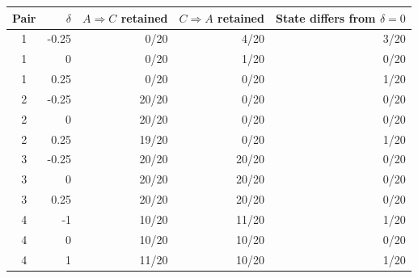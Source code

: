 \begin{table}
\label{tab:split-retention}
\begin{tabular}{crrrr}
\toprule
Pair & $\delta$ & $A\Rightarrow C$ retained & $C\Rightarrow A$ retained & State differs from $\delta=0$ \\
\midrule
1 & -0.25 & 0/20 & 4/20 & 3/20 \\
1 & 0 & 0/20 & 1/20 & 0/20 \\
1 & 0.25 & 0/20 & 0/20 & 1/20 \\
2 & -0.25 & 20/20 & 0/20 & 0/20 \\
2 & 0 & 20/20 & 0/20 & 0/20 \\
2 & 0.25 & 19/20 & 0/20 & 1/20 \\
3 & -0.25 & 20/20 & 20/20 & 0/20 \\
3 & 0 & 20/20 & 20/20 & 0/20 \\
3 & 0.25 & 20/20 & 20/20 & 0/20 \\
4 & -1 & 10/20 & 11/20 & 1/20 \\
4 & 0 & 10/20 & 10/20 & 0/20 \\
4 & 1 & 11/20 & 10/20 & 1/20 \\
\bottomrule
\end{tabular}
\end{table}

